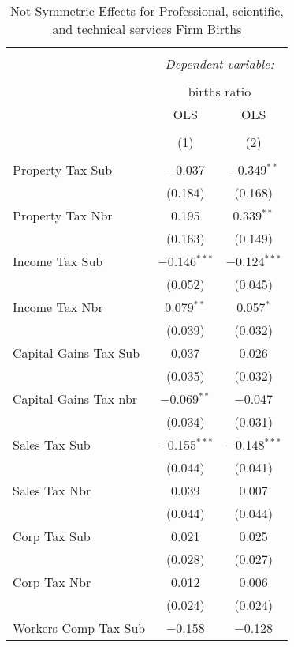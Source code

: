 
\begin{table}[!htbp] \centering 
  \caption{Not Symmetric Effects for  Professional, scientific, and technical services Firm Births} 
  \label{} 
\begin{tabular}{@{\extracolsep{5pt}}lcc} 
\\[-1.8ex]\hline 
\hline \\[-1.8ex] 
 & \multicolumn{2}{c}{\textit{Dependent variable:}} \\ 
\cline{2-3} 
\\[-1.8ex] & \multicolumn{2}{c}{births ratio} \\ 
 & OLS & OLS \\ 
\\[-1.8ex] & (1) & (2)\\ 
\hline \\[-1.8ex] 
 Property Tax Sub & $-$0.037 & $-$0.349$^{**}$ \\ 
  & (0.184) & (0.168) \\ 
  Property Tax Nbr & 0.195 & 0.339$^{**}$ \\ 
  & (0.163) & (0.149) \\ 
  Income Tax Sub & $-$0.146$^{***}$ & $-$0.124$^{***}$ \\ 
  & (0.052) & (0.045) \\ 
  Income Tax Nbr & 0.079$^{**}$ & 0.057$^{*}$ \\ 
  & (0.039) & (0.032) \\ 
  Capital Gains Tax Sub & 0.037 & 0.026 \\ 
  & (0.035) & (0.032) \\ 
  Capital Gains Tax nbr & $-$0.069$^{**}$ & $-$0.047 \\ 
  & (0.034) & (0.031) \\ 
  Sales Tax Sub & $-$0.155$^{***}$ & $-$0.148$^{***}$ \\ 
  & (0.044) & (0.041) \\ 
  Sales Tax Nbr & 0.039 & 0.007 \\ 
  & (0.044) & (0.044) \\ 
  Corp Tax Sub & 0.021 & 0.025 \\ 
  & (0.028) & (0.027) \\ 
  Corp Tax Nbr & 0.012 & 0.006 \\ 
  & (0.024) & (0.024) \\ 
  Workers Comp Tax Sub & $-$0.158 & $-$0.128 \\ 

\end{tabular}
\end{table}
